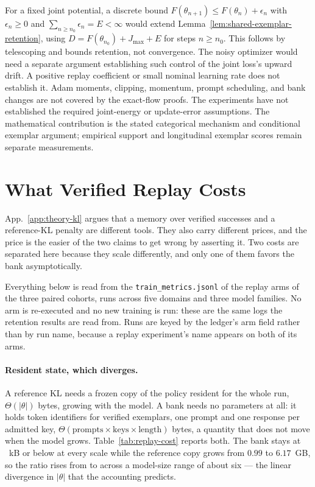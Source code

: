 \documentclass{article}
\newcommand{\1}{\mathbf 1}
\theoremstyle{remark}
\theoremstyle{definition}
\theoremstyle{plain}
\begin{document}
For a fixed joint potential, a discrete bound
$F(\theta_{n+1})\le F(\theta_n)+\epsilon_n$ with
$\epsilon_n\ge0$ and $\sum_{n\ge n_0}\epsilon_n=E<\infty$ would extend
Lemma~\ref{lem:shared-exemplar-retention}, using
$D=F(\theta_{n_0})+J_{\max}+E$ for steps $n\ge n_0$.
This follows by telescoping and bounds retention, not convergence. The noisy
optimizer would need a separate argument establishing such control of the
joint loss's upward drift. A positive replay coefficient or small nominal
learning rate does not establish it. Adam moments, clipping, momentum, prompt
scheduling, and bank changes are not covered by the exact-flow proofs.
The experiments have not established the required joint-energy or
update-error assumptions. The mathematical contribution is the stated
categorical mechanism and conditional exemplar argument; empirical support
and longitudinal exemplar scores remain separate measurements.


\section{What Verified Replay Costs}
\label{app:replay-cost}

App.~\ref{app:theory-kl} argues that a memory over verified successes and a
reference-KL penalty are different tools. They also carry different prices, and
the price is the easier of the two claims to get wrong by asserting it. Two
costs are separated here because they scale differently, and only one of them
favors the bank asymptotically.

Everything below is read from the \texttt{train\_metrics.jsonl} of the replay
arms of the three paired cohorts, \MDcostRuns{} runs across five domains and
three model families. No arm is re-executed and no new training is run: these
are the same logs the retention results are read from. Runs are keyed by the
ledger's arm field rather than by run name, because a replay experiment's name
appears on both of its arms.

\paragraph{Resident state, which diverges.}
A reference KL needs a frozen copy of the policy resident for the whole run,
$\Theta(|\theta|)$ bytes, growing with the model. A bank needs no parameters at
all: it holds token identifiers for verified exemplars, one prompt and one
response per admitted key, $\Theta(\text{prompts}\times\text{keys}\times
\text{length})$ bytes, a quantity that does not move when the model grows.
Table~\ref{tab:replay-cost} reports both. The bank stays at
\MDcostBankKB{}~kB or below at every scale while the reference copy grows from
$0.99$ to $6.17$~GB, so the ratio rises from \MDcostStateMin{} to
\MDcostStateMax{} across a model-size range of about six --- the linear
divergence in $|\theta|$ that the accounting predicts.
\end{document}
